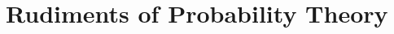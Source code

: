 \documentclass[../../main.tex]{subfiles}
\begin{document}
\chapter{Rudiments of Probability Theory}
\end{document}
